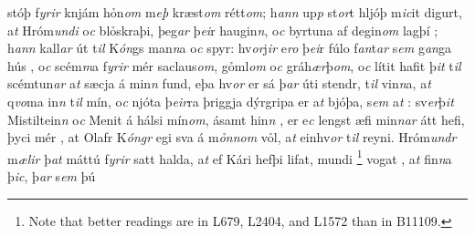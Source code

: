 stóþ  f\textit{yrir} knjám hỏn\textit{om} m\textit{eþ}
kræst\textit{om} rétt\textit{om}; h\textit{ann}  up\textit{p} st\textit{or}t hljóþ   m\textit{ic}it    digurt, 
a\textit{t} Hróm\textit{undi}
o\textit{c}   blỏskraþi, þeg\textit{ar} þ\textit{ei}r    haugin\textit{n}, o\textit{c} byrtuna af degin\textit{om} lagþí  ; h\textit{ann} kall\textit{ar} út t\textit{il} K\textit{ón}gs
man\textit{n}a o\textit{c} spyr:  hv\textit{or}j\textit{ir}
e\textit{ro} þ\textit{ei}r   fúlo   f\textit{an}t\textit{ar} 
s\textit{em} g\textit{an}ga   hús  , o\textit{c} scém\textit{m}a   f\textit{yrir} mér saclaus\textit{om}, gỏml\textit{om} o\textit{c}
gráh\textit{ær}þ\textit{om}, o\textit{c} lítit hafit
þ\textit{it} t\textit{il} scémtun\textit{ar}  a\textit{t} sæcja á min\textit{n} fund,  eþa hv\textit{or} er
sá þ\textit{ar} úti stendr,    t\textit{il} vin\textit{n}a, a\textit{t} q\textit{vo}ma 
in\textit{n} t\textit{il} mín, o\textit{c} njóta þ\textit{eir}ra þriggja
dýrgripa er     a\textit{t} bjóþa, s\textit{em} a\textit{t} : sv\textit{er}þ\textit{it} Mistiltein\textit{n} o\textit{c} Menit á hálsi mín\textit{om}, ásamt hin\textit{n}  
, 
er  e\textit{c} lengst æfi
min\textit{n}\textit{ar} átt hefi, þyci mér  , at  Olafr K\textit{óngr} egi sva á m\textit{ỏnnom} vỏl,
a\textit{t} einhv\textit{or} t\textit{il} reyni. Hróm\textit{undr} m\textit{ælir} þ\textit{at} máttú f\textit{yrir} satt halda,
a\textit{t} ef Kári hefþi lifat,  
mundi  \footnote{Note that better readings are in L679, L2404, and L1572 than in B11109.}    vogat   , a\textit{t} fin\textit{n}a þ\textit{ic}, þ\textit{ar} s\textit{em} þú
